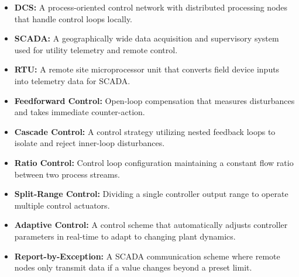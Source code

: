 \documentclass[12pt,a4paper]{article}
\begin{document}
\begin{tcolorbox}[defbox, title={\textbf{One-Line Definitions}}]
\begin{itemize}[leftmargin=*, itemsep=2pt, topsep=0pt]
  \item \textbf{DCS:} A process-oriented control network with distributed processing nodes that handle control loops locally.
  \item \textbf{SCADA:} A geographically wide data acquisition and supervisory system used for utility telemetry and remote control.
  \item \textbf{RTU:} A remote site microprocessor unit that converts field device inputs into telemetry data for SCADA.
  \item \textbf{Feedforward Control:} Open-loop compensation that measures disturbances and takes immediate counter-action.
  \item \textbf{Cascade Control:} A control strategy utilizing nested feedback loops to isolate and reject inner-loop disturbances.
  \item \textbf{Ratio Control:} Control loop configuration maintaining a constant flow ratio between two process streams.
  \item \textbf{Split-Range Control:} Dividing a single controller output range to operate multiple control actuators.
  \item \textbf{Adaptive Control:} A control scheme that automatically adjusts controller parameters in real-time to adapt to changing plant dynamics.
  \item \textbf{Report-by-Exception:} A SCADA communication scheme where remote nodes only transmit data if a value changes beyond a preset limit.
\end{itemize}
\end{tcolorbox}
\end{document}
